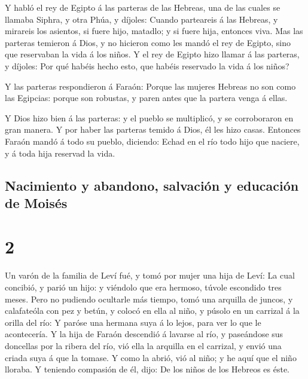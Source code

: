  Y habló el rey de Egipto á las parteras de las Hebreas,
una de las cuales se llamaba Siphra, y otra Phúa, y díjoles:
 Cuando parteareis á las Hebreas, y mirareis los
asientos, si fuere hijo, matadlo; y si fuere hija, entonces viva.
 Mas las parteras temieron á Dios, y no hicieron como les
mandó el rey de Egipto, sino que reservaban la vida á los niños.
 Y el rey de Egipto hizo llamar á las parteras, y
díjoles: Por qué habéis hecho esto, que habéis reservado la vida á los
niños?

 Y las parteras respondieron á Faraón: Porque las mujeres
Hebreas no son como las Egipcias: porque son robustas, y paren antes que
la partera venga á ellas.

 Y Dios hizo bien á las parteras: y el pueblo se
multiplicó, y se corroboraron en gran manera.  Y por
haber las parteras temido á Dios, él les hizo casas. 
Entonces Faraón mandó á todo su pueblo, diciendo: Echad en el río todo
hijo que naciere, y á toda hija reservad la vida.

\hypertarget{nacimiento-y-abandono-salvaciuxf3n-y-educaciuxf3n-de-moisuxe9s}{%
\subsection{Nacimiento y abandono, salvación y educación de
Moisés}\label{nacimiento-y-abandono-salvaciuxf3n-y-educaciuxf3n-de-moisuxe9s}}

\hypertarget{section-02-2}{%
\section{2}\label{section-02-2}}

 Un varón de la familia de Leví fué, y tomó por mujer una
hija de Leví:  La cual concibió, y parió un hijo: y
viéndolo que era hermoso, túvole escondido tres meses. 
Pero no pudiendo ocultarle más tiempo, tomó una arquilla de juncos, y
calafateóla con pez y betún, y colocó en ella al niño, y púsolo en un
carrizal á la orilla del río:  Y paróse una hermana suya á
lo lejos, para ver lo que le acontecería.  Y la hija de
Faraón descendió á lavarse al río, y paseándose sus doncellas por la
ribera del río, vió ella la arquilla en el carrizal, y envió una criada
suya á que la tomase.  Y como la abrió, vió al niño; y he
aquí que el niño lloraba. Y teniendo compasión de él, dijo: De los niños
de los Hebreos es éste.

